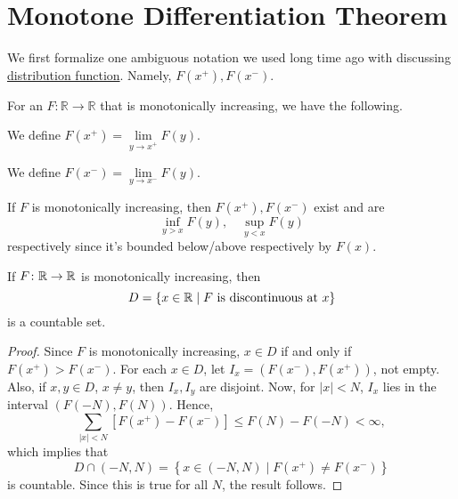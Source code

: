 \section{Monotone Differentiation Theorem}
We first formalize one ambiguous notation we used long time ago with discussing \hyperref[def:distribution-function]{distribution function}.
Namely, \(F(x^+), F(x^-)\).
\begin{definition*}
	For an \(F \colon  \mathbb{R} \to \mathbb{R}\) that is monotonically increasing, we have the following.
	\begin{definition}[\(F(x^+)\)]\label{def:x-plus}
		We define \(F(x^+) = \lim\limits_{y \to x^+} F(y)\).
	\end{definition}
	\begin{definition}[\(F(x^-)\)]\label{def:x-minus}
		We define \(F(x^-) = \lim\limits_{y \to x^-} F(y)\).
	\end{definition}
\end{definition*}
\begin{remark}
	If \(F\) is monotonically increasing, then \(F(x^+), F(x^-)\) exist and are
	\[
		\inf_{y > x} F(y),\quad \sup_{y < x} F(y)
	\]
	respectively since it's bounded below/above respectively by \(F(x)\).
\end{remark}
\begin{lemma}\label{lma:lec-33}
	If \(F\colon \mathbb{\MakeUppercase{r}} \to \mathbb{\MakeUppercase{r}} \) is monotonically increasing, then
	\[
		D = \{x\in \mathbb{\MakeUppercase{r}}  \mid F \text{ is discontinuous at } x\}
	\]
	is a countable set.
\end{lemma}
\begin{proof}
	Since \(F\) is monotonically increasing, \(x \in D\) if and only if \(F(x^+) > F(x^-)\). For each \(x \in D\), let \(I_x = (F(x^-),F(x^+))\), not empty.
	Also, if \(x,y \in D\), \(x \neq y\), then \(I_x,I_y\) are disjoint. Now, for \(\left\vert x \right\vert < N\), \(I_x\) lies in the interval
	\((F(-N), F(N))\). Hence,
	\[
		\sum\limits_{\left\vert x \right\vert < N}\left[F(x^+) - F(x^-)\right] \leq F(N) - F(-N) <\infty,
	\]
	which implies that
	\[
		D \cap (-N, N) = \left\{x\in (-N, N) \mid F(x^+) \neq F(x^-)\right\}
	\]
	is countable. Since this is true for all \(N\), the result follows.
\end{proof}

